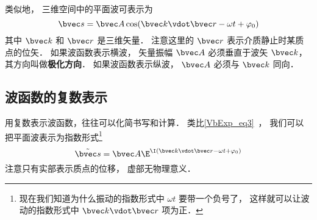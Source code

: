 类似地， 三维空间中的平面波可表示为
\begin{equation}
\bvec s = \bvec A \cos(\bvec k \vdot \bvec r - \omega t + \varphi_0)
\end{equation}
其中 $\bvec k$ 和 $\bvec r$ 是三维矢量． 注意这里的 $\bvec r$ 表示介质静止时某质点的位矢． 如果波函数表示横波， 矢量振幅 $\bvec A$ 必须垂直于波矢 $\bvec k$， 其方向叫做\textbf{极化方向}． 如果波函数表示纵波， $\bvec A$ 必须与 $\bvec k$ 同向．

\subsection{波函数的复数表示}

用复数表示波函数，往往可以化简书写和计算． 类比\autoref{VbExp_eq3}~， 我们可以把平面波表示为指数形式\footnote{现在我们知道为什么振动的指数形式中 $\omega t$ 要带一个负号了， 这样就可以让波动的指数形式中 $\bvec k\vdot \bvec r$ 项为正．}
\begin{equation}
\tilde {\bvec s} = \bvec A \E^{\I( \bvec k \vdot \bvec r - \omega t + \varphi_0)}
\end{equation}
注意只有实部表示质点的位移， 虚部无物理意义．

